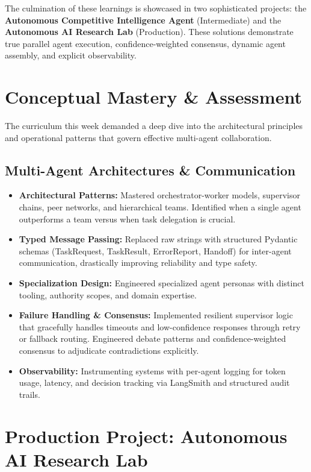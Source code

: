 \documentclass[12pt, a4paper]{article}
\begin{document}
The culmination of these learnings is showcased in two sophisticated projects: the \textbf{Autonomous Competitive Intelligence Agent} (Intermediate) and the \textbf{Autonomous AI Research Lab} (Production). These solutions demonstrate true parallel agent execution, confidence-weighted consensus, dynamic agent assembly, and explicit observability.

\section{Conceptual Mastery \& Assessment}
The curriculum this week demanded a deep dive into the architectural principles and operational patterns that govern effective multi-agent collaboration.

\subsection{Multi-Agent Architectures \& Communication}
\begin{itemize}[label=\textcolor{secondary}{$\bullet$}]
    \item \textbf{Architectural Patterns:} Mastered orchestrator-worker models, supervisor chains, peer networks, and hierarchical teams. Identified when a single agent outperforms a team versus when task delegation is crucial.
    \item \textbf{Typed Message Passing:} Replaced raw strings with structured Pydantic schemas (TaskRequest, TaskResult, ErrorReport, Handoff) for inter-agent communication, drastically improving reliability and type safety.
    \item \textbf{Specialization Design:} Engineered specialized agent personas with distinct tooling, authority scopes, and domain expertise.
    \item \textbf{Failure Handling \& Consensus:} Implemented resilient supervisor logic that gracefully handles timeouts and low-confidence responses through retry or fallback routing. Engineered debate patterns and confidence-weighted consensus to adjudicate contradictions explicitly.
    \item \textbf{Observability:} Instrumenting systems with per-agent logging for token usage, latency, and decision tracking via LangSmith and structured audit trails.
\end{itemize}

\newpage

\section{Production Project: Autonomous AI Research Lab}
\end{document}
